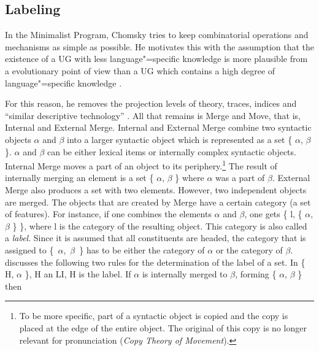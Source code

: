 \subsection{Labeling}
\label{Abschnitt-Labeling}

In the Minimalist Program, Chomsky tries to keep combinatorial operations and mechanisms as simple as possible. He motivates this with
the assumption that the existence of a UG with less language"=specific knowledge is more plausible from a evolutionary point of view than a UG
which contains a high degree of language"=specific knowledge \citep[]{Chomsky2008a}.

For this reason, he removes the projection levels of \xbar theory, traces,
indices and ``similar descriptive technology'' \citep[]{Chomsky2008a}. All that remains is Merge and Move, that is, Internal and External Merge. Internal and External Merge combine two syntactic objects $\alpha$ and $\beta$ into a larger
syntactic object which is represented as a set \{ $\alpha$, $\beta$ \}.  $\alpha$ and $\beta$ can be
either lexical items or internally complex syntactic objects. Internal Merge moves a part of an object to its periphery.\footnote{%
To be more specific, part of a syntactic object is copied and the copy is placed at the edge of the entire object. The original of this copy is
no longer relevant for pronunciation (\emph{Copy Theory of Move\-ment}).
} The result of internally merging
an element is a set \{ $\alpha$, $\beta$ \} where $\alpha$ was a part of $\beta$. External Merge
also produces a set with two elements. However, two independent objects are merged. The objects that are created
by Merge have a certain category (a set of features). For instance, if one combines the elements $\alpha$ and $\beta$, one
gets \{ l, \{ $\alpha$, $\beta$ \} \}, where l is the category of the resulting object. This category
is also called a \emph{label}. Since it is assumed that all constituents are headed, the category that is
assigned to \{~$\alpha$,~$\beta$~\} has to be either the category of $\alpha$ or the category of
$\beta$. 
\citet[]{Chomsky2008a} discusses the following two rules for the determination of the label of a set.
\eal
\label{Label-Berechnung}
\ex\label{Label1} In \{ H, $\alpha$ \}, H an LI, H is the label.
\ex\label{Label2} If $\alpha$ is internally merged to $\beta$, forming \{ $\alpha$, $\beta$ \} then
